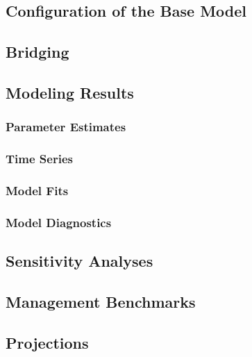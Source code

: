 \documentclass[
  letterpaper,
]{article}
\begin{document}
\subsection{Configuration of the Base
Model}\label{sec-configuration-of-the-base-model}

\subsection{Bridging}\label{sec-bridging}

\newpage{}

\subsection{Modeling Results}\label{sec-assmt-results}

\subsubsection{Parameter Estimates}\label{sec-parameter-estimates}

\subsubsection{Time Series}\label{sec-time-series}

\subsubsection{Model Fits}\label{sec-model-fits}

\subsubsection{Model Diagnostics}\label{sec-model-diagnostics}

\newpage{}

\subsection{Sensitivity Analyses}\label{sec-assmt-sens}

\newpage{}

\subsection{Management Benchmarks}\label{sec-assmt-bench}

\newpage{}

\subsection{Projections}\label{sec-assmt-proj}
\end{document}
